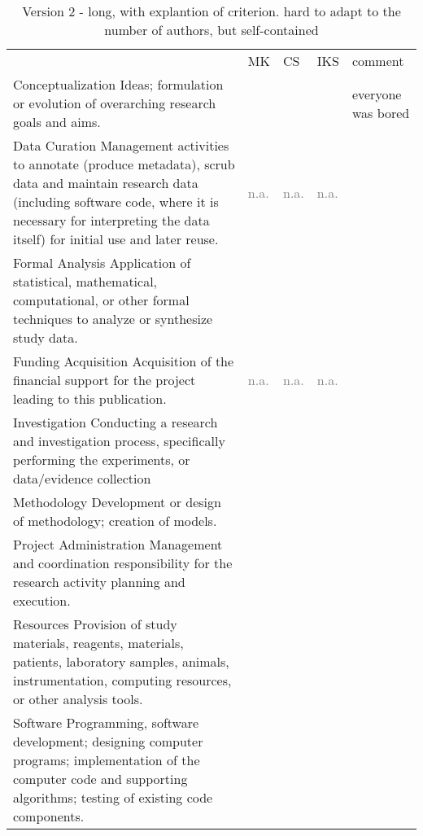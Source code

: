\documentclass{article}
\newcommand{\low}[0]{\cellcolor{black!25}~}
\newcommand{\medium}[0]{\cellcolor{black!50}~}
\newcommand{\sole}[0]{\cellcolor{black}~}
\newcommand{\na}[0]{\textcolor{gray}{n.a.}}
\begin{document}
\begin{table}
\caption{Version 2 - long, with explantion of criterion. hard to adapt to the number of authors, but self-contained}
\begin{tabular}{p{8cm}lllp{4cm}}
 & MK & CS & IKS & comment \\
Conceptualization\newline
\footnotesize{Ideas; formulation or evolution of overarching research goals and aims.} 
    & \low 
    & \low 
    & \medium
    & everyone was bored\\
Data Curation \newline
\footnotesize{Management activities to annotate (produce metadata), scrub data and maintain research data (including software code, where it is necessary for interpreting the data itself) for initial use and later reuse.}
    & \na
    & \na
    & \na\\
Formal Analysis\newline
\footnotesize{Application of statistical, mathematical, computational, or other formal techniques to analyze or synthesize study data.}
    & \
    & 
    & \\
Funding Acquisition\newline
\footnotesize{Acquisition of the financial support for the project leading to this publication.}
    & \na
    & \na
    & \na\\
Investigation\newline
\footnotesize{Conducting a research and investigation process, specifically performing the experiments, or data/evidence collection}
    & \sole
    & 
    & \\
Methodology\newline
\footnotesize{Development or design of methodology; creation of models.}
    & 
    & \medium
    & \medium\\
Project Administration\newline
\footnotesize{Management and coordination responsibility for the research activity planning and execution.}
    & 
    & 
    & \\
Resources\newline
\footnotesize{Provision of study materials, reagents, materials, patients, laboratory samples, animals, instrumentation, computing resources, or other analysis tools.}
    & 
    & 
    & \\
Software \newline
\footnotesize{Programming, software development; designing computer programs; implementation of the computer code and supporting algorithms; testing of existing code components.}

\end{tabular}
\end{table}
\end{document}
